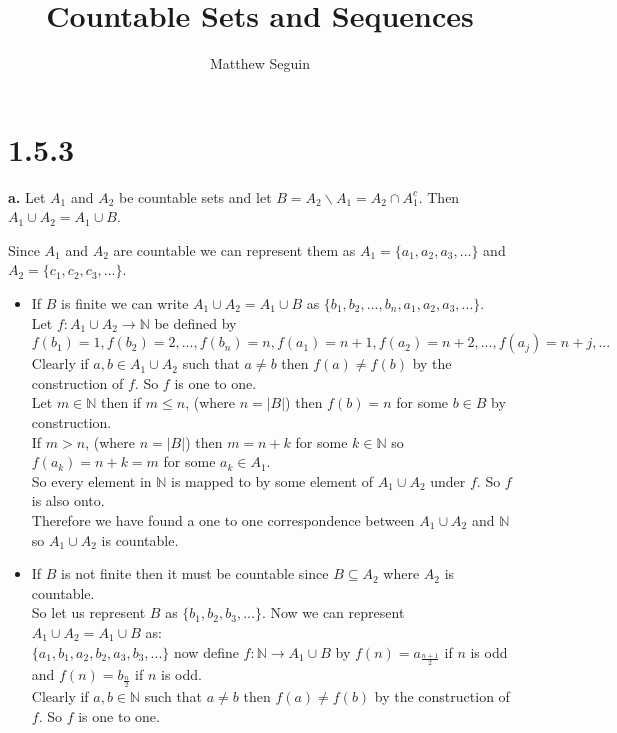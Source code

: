 \documentclass{article}
\title{Countable Sets and Sequences}
\author{Matthew Seguin}
\date{}
\begin{document}
\maketitle


\section*{1.5.3}

{\Large \textbf{a.}} Let $A_1$ and $A_2$ be countable sets and let $B = A_2\backslash A_1 = A_2\cap A_1^c$. Then $A_1\cup A_2 = A_1\cup B$.
\begin{center}
    \doublespacing
    Since $A_1$ and $A_2$ are countable we can represent them as $A_1 = \{a_1, a_2, a_3, ...\}$ and $A_2 = \{c_1, c_2, c_3, ...\}$.
    \begin{itemize}
        \item If $B$ is finite we can write $A_1\cup A_2 = A_1\cup B$ as $\{b_1, b_2, ..., b_n, a_1, a_2, a_3, ...\}$.
        \\Let $f: A_1\cup A_2\rightarrow\mathbb{N}$ be defined by $f(b_1) = 1, f(b_2) = 2, ..., f(b_n) = n, f(a_1) = n+1, f(a_2) = n+2, ..., f(a_j) = n+j, ...$
        \\Clearly if $a, b\in A_1\cup A_2$ such that $a\neq b$ then $f(a)\neq f(b)$ by the construction of $f$. So $f$ is one to one.
        \\Let $m\in\mathbb{N}$ then if $m\leq n$, (where $n = |B|$) then $f(b) = n$ for some $b\in B$ by construction.
        \\If $m > n$, (where $n = |B|$) then $m = n + k$ for some $k\in\mathbb{N}$ so $f(a_k) = n + k = m$ for some $a_k\in A_1$.
        \\So every element in $\mathbb{N}$ is mapped to by some element of $A_1\cup A_2$ under $f$. So $f$ is also onto.
        \\Therefore we have found a one to one correspondence between $A_1\cup A_2$ and $\mathbb{N}$ so $A_1\cup A_2$ is countable.
        \item If $B$ is not finite then it must be countable since $B\subseteq A_2$ where $A_2$ is countable.
        \\So let us represent $B$ as $\{b_1, b_2, b_3, ...\}$. Now we can represent $A_1\cup A_2 = A_1\cup B$ as:
        \\$\{a_1, b_1, a_2, b_2, a_3, b_3, ...\}$ now define $f:\mathbb{N}\rightarrow A_1\cup B$ by $f(n) = a_{\frac{n+1}{2}}$ if $n$ is odd and $f(n) = b_{\frac{n}{2}}$ if $n$ is odd.
        \\Clearly if $a, b\in\mathbb{N}$ such that $a\neq b$ then $f(a)\neq f(b)$ by the construction of $f$. So $f$ is one to one.

\end{itemize}
\end{center}
\end{document}

